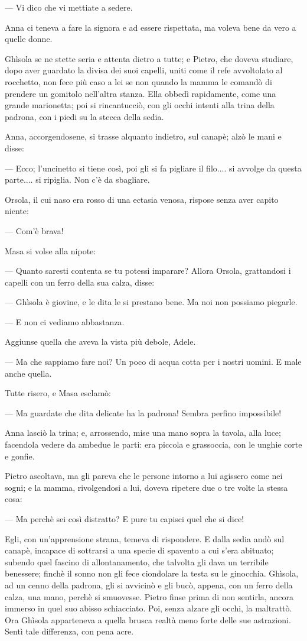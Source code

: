 — Vi dico che vi mettiate a sedere.

Anna ci teneva a fare la signora e ad essere rispettata, ma voleva bene da vero a quelle donne.

Ghìsola se ne stette seria e attenta dietro a tutte; e Pietro, che doveva studiare, dopo aver guardato la divisa dei suoi capelli, uniti come il refe avvoltolato al rocchetto, non fece più caso a lei se non quando la mamma le comandò di prendere un gomitolo nell'altra stanza. Ella obbedì rapidamente, come una grande marionetta; poi si rincantucciò, con gli occhi intenti alla trina della padrona, con i piedi su la stecca della sedia.

Anna, accorgendosene, si trasse alquanto indietro, sul canapè; alzò le mani e disse:

— Ecco; l'uncinetto si tiene così, poi gli si fa pigliare il filo.... si avvolge da questa parte.... si ripiglia. Non c'è da sbagliare.

Orsola, il cui naso era rosso di una ectasia venosa, rispose senza aver capito niente:

— Com'è brava!

Masa si volse alla nipote:

— Quanto saresti contenta se tu potessi imparare? Allora Orsola, grattandosi i capelli con un ferro della sua calza, disse:

— Ghìsola è giovine, e le dita le si prestano bene. Ma noi non possiamo piegarle.

— E non ci vediamo abbastanza.

Aggiunse quella che aveva la vista più debole, Adele.

— Ma che sappiamo fare noi? Un poco di acqua cotta per i nostri uomini. E male anche quella.

Tutte risero, e Masa esclamò:

— Ma guardate che dita delicate ha la padrona! Sembra perfino impossibile!

Anna lasciò la trina; e, arrossendo, mise una mano sopra la tavola, alla luce; facendola vedere da ambedue le parti: era piccola e grassoccia, con le unghie corte e gonfie.

Pietro ascoltava, ma gli pareva che le persone intorno a lui agissero come nei sogni; e la mamma, rivolgendosi a lui, doveva ripetere due o tre volte la stessa cosa:

— Ma perchè sei così distratto? E pure tu capisci quel che si dice!

Egli, con un’apprensione strana, temeva di rispondere. E dalla sedia andò sul canapè, incapace di sottrarsi a una specie di spavento a cui s’era abituato; subendo quel fascino di allontanamento, che talvolta gli dava un terribile benessere; finchè il sonno non gli fece ciondolare la testa su le ginocchia. Ghìsola, ad un cenno della padrona, gli si avvicinò e gli bucò, appena, con un ferro della calza, una mano, perchè si smuovesse. Pietro finse prima di non sentirla, ancora immerso in quel suo abisso schiacciato. Poi, senza alzare gli occhi, la maltrattò. Ora Ghìsola apparteneva a quella brusca realtà meno forte delle sue astrazioni. Sentì tale differenza, con pena acre.

